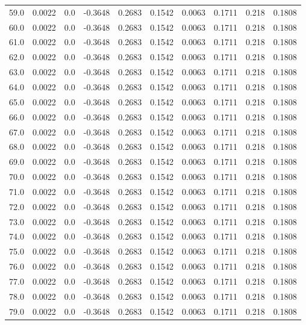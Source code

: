 \begin{longtable}{lrrrrrrrrr}
59.0 & 0.0022 & 0.0 & -0.3648 & 0.2683 & 0.1542 & 0.0063 & 0.1711 & 0.218 & 0.1808 \\
60.0 & 0.0022 & 0.0 & -0.3648 & 0.2683 & 0.1542 & 0.0063 & 0.1711 & 0.218 & 0.1808 \\
61.0 & 0.0022 & 0.0 & -0.3648 & 0.2683 & 0.1542 & 0.0063 & 0.1711 & 0.218 & 0.1808 \\
62.0 & 0.0022 & 0.0 & -0.3648 & 0.2683 & 0.1542 & 0.0063 & 0.1711 & 0.218 & 0.1808 \\
63.0 & 0.0022 & 0.0 & -0.3648 & 0.2683 & 0.1542 & 0.0063 & 0.1711 & 0.218 & 0.1808 \\
64.0 & 0.0022 & 0.0 & -0.3648 & 0.2683 & 0.1542 & 0.0063 & 0.1711 & 0.218 & 0.1808 \\
65.0 & 0.0022 & 0.0 & -0.3648 & 0.2683 & 0.1542 & 0.0063 & 0.1711 & 0.218 & 0.1808 \\
66.0 & 0.0022 & 0.0 & -0.3648 & 0.2683 & 0.1542 & 0.0063 & 0.1711 & 0.218 & 0.1808 \\
67.0 & 0.0022 & 0.0 & -0.3648 & 0.2683 & 0.1542 & 0.0063 & 0.1711 & 0.218 & 0.1808 \\
68.0 & 0.0022 & 0.0 & -0.3648 & 0.2683 & 0.1542 & 0.0063 & 0.1711 & 0.218 & 0.1808 \\
69.0 & 0.0022 & 0.0 & -0.3648 & 0.2683 & 0.1542 & 0.0063 & 0.1711 & 0.218 & 0.1808 \\
70.0 & 0.0022 & 0.0 & -0.3648 & 0.2683 & 0.1542 & 0.0063 & 0.1711 & 0.218 & 0.1808 \\
71.0 & 0.0022 & 0.0 & -0.3648 & 0.2683 & 0.1542 & 0.0063 & 0.1711 & 0.218 & 0.1808 \\
72.0 & 0.0022 & 0.0 & -0.3648 & 0.2683 & 0.1542 & 0.0063 & 0.1711 & 0.218 & 0.1808 \\
73.0 & 0.0022 & 0.0 & -0.3648 & 0.2683 & 0.1542 & 0.0063 & 0.1711 & 0.218 & 0.1808 \\
74.0 & 0.0022 & 0.0 & -0.3648 & 0.2683 & 0.1542 & 0.0063 & 0.1711 & 0.218 & 0.1808 \\
75.0 & 0.0022 & 0.0 & -0.3648 & 0.2683 & 0.1542 & 0.0063 & 0.1711 & 0.218 & 0.1808 \\
76.0 & 0.0022 & 0.0 & -0.3648 & 0.2683 & 0.1542 & 0.0063 & 0.1711 & 0.218 & 0.1808 \\
77.0 & 0.0022 & 0.0 & -0.3648 & 0.2683 & 0.1542 & 0.0063 & 0.1711 & 0.218 & 0.1808 \\
78.0 & 0.0022 & 0.0 & -0.3648 & 0.2683 & 0.1542 & 0.0063 & 0.1711 & 0.218 & 0.1808 \\
79.0 & 0.0022 & 0.0 & -0.3648 & 0.2683 & 0.1542 & 0.0063 & 0.1711 & 0.218 & 0.1808 \\

\end{longtable}
